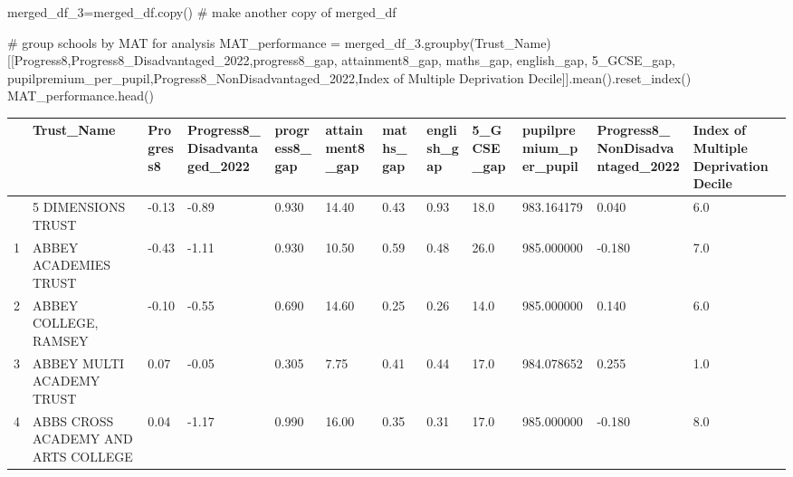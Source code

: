 \documentclass[
  letterpaper,
  DIV=11,
  numbers=noendperiod]{scrartcl}
\newenvironment{Shaded}{\begin{snugshade}}{\end{snugshade}}
\newcommand{\CommentTok}[1]{\textcolor[rgb]{0.37,0.37,0.37}{#1}}
\newcommand{\NormalTok}[1]{\textcolor[rgb]{0.00,0.23,0.31}{#1}}
\newcommand{\OperatorTok}[1]{\textcolor[rgb]{0.37,0.37,0.37}{#1}}
\newcommand{\StringTok}[1]{\textcolor[rgb]{0.13,0.47,0.30}{#1}}
\begin{document}
\begin{Shaded}
\begin{Highlighting}[]
\NormalTok{merged\_df\_3}\OperatorTok{=}\NormalTok{merged\_df.copy() }\CommentTok{\# make another copy of merged\_df}
\end{Highlighting}
\end{Shaded}

\begin{Shaded}
\begin{Highlighting}[]
\CommentTok{\# group schools by MAT for analysis}
\NormalTok{MAT\_performance }\OperatorTok{=}\NormalTok{ merged\_df\_3.groupby(}\StringTok{\textquotesingle{}Trust\_Name\textquotesingle{}}\NormalTok{)[[}\StringTok{\textquotesingle{}Progress8\textquotesingle{}}\NormalTok{,}\StringTok{\textquotesingle{}Progress8\_Disadvantaged\_2022\textquotesingle{}}\NormalTok{,}\StringTok{\textquotesingle{}progress8\_gap\textquotesingle{}}\NormalTok{,}
                                                      \StringTok{\textquotesingle{}attainment8\_gap\textquotesingle{}}\NormalTok{,}
                                                            \StringTok{\textquotesingle{}maths\_gap\textquotesingle{}}\NormalTok{,}
                                                          \StringTok{\textquotesingle{}english\_gap\textquotesingle{}}\NormalTok{,}
                                                           \StringTok{\textquotesingle{}5\_GCSE\_gap\textquotesingle{}}\NormalTok{,}
                                               \StringTok{\textquotesingle{}pupilpremium\_per\_pupil\textquotesingle{}}\NormalTok{,}\StringTok{\textquotesingle{}Progress8\_NonDisadvantaged\_2022\textquotesingle{}}\NormalTok{,}\StringTok{\textquotesingle{}Index of Multiple Deprivation Decile\textquotesingle{}}\NormalTok{]].mean().reset\_index()}
\NormalTok{MAT\_performance.head()}
\end{Highlighting}
\end{Shaded}

\begin{longtable}[]{@{}llllllllllll@{}}
\toprule\noalign{}
& Trust\_Name & Progress8 & Progress8\_Disadvantaged\_2022 &
progress8\_gap & attainment8\_gap & maths\_gap & english\_gap &
5\_GCSE\_gap & pupilpremium\_per\_pupil &
Progress8\_NonDisadvantaged\_2022 & Index of Multiple Deprivation
Decile \\
\midrule\noalign{}
\endhead
\bottomrule\noalign{}
\endlastfoot
0 & 5 DIMENSIONS TRUST & -0.13 & -0.89 & 0.930 & 14.40 & 0.43 & 0.93 &
18.0 & 983.164179 & 0.040 & 6.0 \\
1 & ABBEY ACADEMIES TRUST & -0.43 & -1.11 & 0.930 & 10.50 & 0.59 & 0.48
& 26.0 & 985.000000 & -0.180 & 7.0 \\
2 & ABBEY COLLEGE, RAMSEY & -0.10 & -0.55 & 0.690 & 14.60 & 0.25 & 0.26
& 14.0 & 985.000000 & 0.140 & 6.0 \\
3 & ABBEY MULTI ACADEMY TRUST & 0.07 & -0.05 & 0.305 & 7.75 & 0.41 &
0.44 & 17.0 & 984.078652 & 0.255 & 1.0 \\
4 & ABBS CROSS ACADEMY AND ARTS COLLEGE & 0.04 & -1.17 & 0.990 & 16.00 &
0.35 & 0.31 & 17.0 & 985.000000 & -0.180 & 8.0 \\
\end{longtable}
\end{document}
